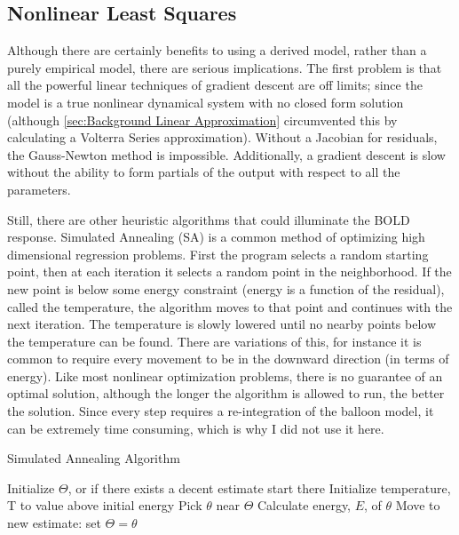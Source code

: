 \subsection{Nonlinear Least Squares}
\label{sec:Nonlinear Least Squares}
Although there are certainly benefits to using a derived model, rather
than a purely empirical model, there are serious implications. The
first problem is that all the powerful linear techniques of gradient
descent are off limits; since the model is a true nonlinear dynamical
system with no closed form solution (although \autoref{sec:Background Linear Approximation}
circumvented this by calculating a Volterra Series approximation). Without
a Jacobian for residuals, the Gauss-Newton method
is impossible. Additionally, a gradient descent is slow
without the ability to form partials of the output with respect
to all the parameters. 

Still, there are other heuristic algorithms
that could illuminate the BOLD response. 
Simulated Annealing (SA) is a common method of optimizing high dimensional
regression problems. First the program selects a random starting point, then
at each iteration it selects a random point in the neighborhood. If the 
new point is 
below some energy constraint (energy is a function of the residual), 
called the temperature, the algorithm moves
to that point and continues with the next iteration. The temperature
is slowly lowered until no nearby points below the temperature can
be found. There are
variations of this, for instance it is common to require every movement
to be in the downward direction (in terms of energy). Like most nonlinear
optimization problems, there is no guarantee of an optimal solution,
although the longer the algorithm is allowed to run, the better the solution.
Since every step requires a re-integration of the  
balloon model, it can be extremely time consuming, which is why I did 
not use it here.

\begin{algorithm}
\caption{Simulated Annealing Algorithm}
\label{alg:Simulated Annealing}
\begin{algorithmic}
\STATE Initialize $\Theta$, or if there exists a decent estimate start there
\STATE Initialize temperature, T to value above initial energy
    \REPEAT
        \STATE Pick $\theta$ near $\Theta$
        \STATE Calculate energy, $E$, of $\theta$
    \STATE Move to new estimate: set $\Theta = \theta$
\ENDWHILE
\end{algorithmic}
\end{algorithm}

